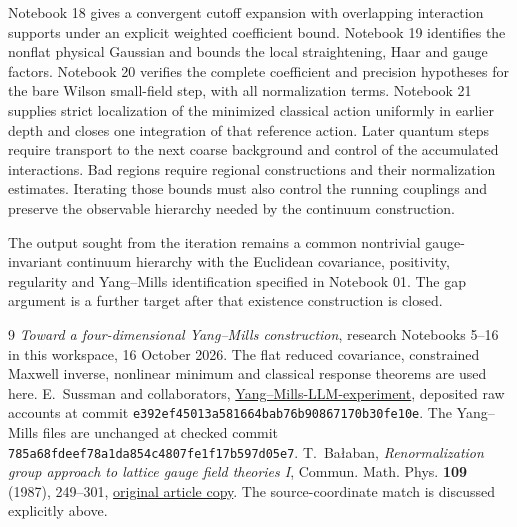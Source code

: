 \documentclass[11pt]{article}
\theoremstyle{remark}
\begin{document}
Notebook 18 gives a convergent cutoff expansion with overlapping
interaction supports under an explicit weighted coefficient bound.
Notebook 19 identifies the nonflat physical Gaussian and bounds
the local straightening, Haar and gauge factors. Notebook 20
verifies the complete coefficient and precision hypotheses for
the bare Wilson small-field step, with all normalization terms.
Notebook 21 supplies strict localization of the minimized
classical action uniformly in earlier depth and closes one
integration of that reference action. Later quantum steps
require transport to the next coarse background and control
of the accumulated interactions. Bad regions require
regional constructions and their normalization estimates. Iterating
those bounds must also control the running couplings and preserve
the observable hierarchy needed by the continuum construction.

The output sought from the iteration remains a common nontrivial
gauge-invariant continuum hierarchy with the Euclidean covariance,
positivity, regularity and Yang--Mills identification specified in
Notebook 01. The gap argument is a further target after that
existence construction is closed.

\begin{thebibliography}{9}
\emph{Toward a four-dimensional Yang--Mills construction},
research Notebooks 5--16 in this workspace, 16 October 2026.
The flat reduced covariance, constrained Maxwell inverse,
nonlinear minimum and classical response theorems are used here.
E.~Sussman and collaborators,
\href{https://github.com/ethanwsussman/Yang--Mills-LLM-experiment}{Yang--Mills-LLM-experiment},
deposited raw accounts at commit
\texttt{e392ef4501\allowbreak 3a581664ba\allowbreak b76b908671\allowbreak 70b30fe10e}.
The Yang--Mills files are unchanged at checked commit
\texttt{785a68fdeef78a1da854c4807fe1f17b597d05e7}.
T.~Ba\l aban, \emph{Renormalization group approach to lattice gauge
field theories I}, Commun. Math. Phys. \textbf{109} (1987), 249--301,
\href{https://scispace.com/pdf/renormalization-group-approach-to-lattice-gauge-field-3ygai0vxt1.pdf}{original article copy}.
The source-coordinate match is discussed explicitly above.
\end{thebibliography}
\end{document}
